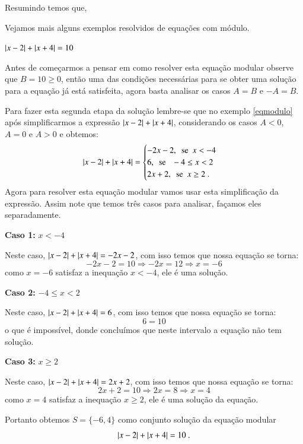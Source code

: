  Resumindo temos que,

  \vskip0.3cm
 \vskip0.3cm

 Vejamos mais alguns exemplos resolvidos de equações com módulo.

 \begin{exem}
    $\left|x-2\right| + \left|x+4\right|= 10$

   Antes de começarmos a pensar em como resolver esta equação modular observe que $B= 10 \geq 0$, então uma das condições necessárias para se obter uma solução para a equação já está satisfeita, agora basta analisar os casos $A= B$ e $-A= B$.

   Para fazer esta segunda etapa da solução lembre-se que no exemplo \autoref{eqmodulo} após simplificarmos a expressão $\left|x-2\right| + \left|x+4\right|$, considerando os casos $A< 0$, $A= 0$ e $A> 0$ e obtemos:
   \[ \left|x-2\right| + \left|x+4\right| = \begin{cases}
      -2x-2, \ \ \text{se} \ \ x < -4 \\
      6, \ \ \text{se } \ \ -4 \leq x < 2 \\
      2x + 2, \ \ \text{se} \ \ x \geq 2 \ .
     \end{cases}
  \]
 Agora para resolver esta equação modular vamos usar esta simplificação da expressão. Assim note que temos três casos para analisar, façamos eles separadamente.

 \textbf{Caso 1:} $x < -4$

 Neste caso, $\left|x-2\right| + \left|x+4\right|= -2x-2$, com isso temos que nossa equação se torna:
 \[-2x-2= 10 \Rightarrow -2x= 12 \Rightarrow x= -6\]
 como $x= -6$ satisfaz a inequação $x< -4$, ele é uma solução.

 \textbf{Caso 2:} $-4 \leq x < 2$

 Neste caso, $\left|x-2\right| + \left|x+4\right|= 6$, com isso temos que nossa equação se torna:
 \[6= 10\]
 o que é impossível, donde concluímos que neste intervalo a equação não tem solução.

 \textbf{Caso 3:} $x \geq 2 $

 Neste caso, $\left|x-2\right| + \left|x+4\right|= 2x + 2$, com isso temos que nossa equação se torna:
 \[2x + 2= 10 \Rightarrow 2x= 8 \Rightarrow x= 4\]
 como $x= 4$ satisfaz a inequação $x \geq 2$, ele é uma solução da equação.

 Portanto obtemos $S=\{-6, 4\}$ como conjunto solução da equação modular
\[\left|x-2\right| + \left|x+4\right|= 10 \ .\]

 \end{exem}


